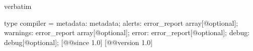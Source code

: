 \begin{camlexample}{verbatim}
\begin{caml}
\begin{camlinput}
type compiler = {
  metadata: metadata;
  alerts: error_report array[@optional];
  warnings: error_report array[@optional];
  error: error_report[@optional];
  debug: debug[@optional];
} [@@since 1.0]
[@@version 1.0]
\end{camlinput}
\end{caml}
\end{camlexample}
